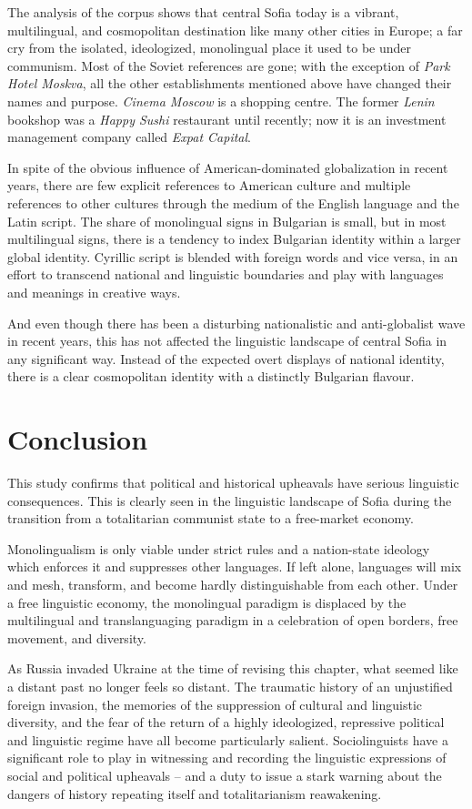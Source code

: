 \documentclass[output=paper]{langscibook}
\begin{document}
The analysis of the corpus shows that central Sofia today is a vibrant, multilingual, and cosmopolitan destination like many other cities in Europe; a far cry from the isolated, ideologized, monolingual place it used to be under communism. Most of the Soviet references are gone; with the exception of \textit{Park Hotel Moskva}, all the other establishments mentioned above have changed their names and purpose. \textit{Cinema Moscow} is a shopping centre. The former \textit{Lenin} bookshop was a \textit{Happy Sushi} restaurant until recently; now it is an investment management company called \textit{Expat Capital}. 

In spite of the obvious influence of American-dominated globalization in recent years, there are few explicit references to American culture and multiple references to other cultures through the medium of the English language and the Latin script. The share of monolingual signs in Bulgarian is small, but in most multilingual signs, there is a tendency to index Bulgarian identity within a larger global identity. Cyrillic script is blended with foreign words and vice versa, in an effort to transcend national and linguistic boundaries and play with languages and meanings in creative ways. 

And even though there has been a disturbing nationalistic and anti-globalist wave in recent years, this has not affected the linguistic landscape of central Sofia in any significant way. Instead of the expected overt displays of national identity, there is a clear cosmopolitan identity with a distinctly Bulgarian flavour.

\section{Conclusion}
This study confirms that political and historical upheavals have serious linguistic consequences. This is clearly seen in the linguistic landscape of Sofia during the transition from a totalitarian communist state to a free-market economy. 

Monolingualism is only viable under strict rules and a nation-state ideology which enforces it and suppresses other languages. If left alone, languages will mix and mesh, transform, and become hardly distinguishable from each other. Under a free linguistic economy, the monolingual paradigm is displaced by the multilingual and translanguaging paradigm in a celebration of open borders, free movement, and diversity. 

As Russia invaded Ukraine at the time of revising this chapter, what seemed like a distant past no longer feels so distant. The traumatic history of an unjustified foreign invasion, the memories of the suppression of cultural and linguistic diversity, and the fear of the return of a highly ideologized, repressive political and linguistic regime have all become particularly salient. Sociolinguists have a significant role to play in witnessing and recording the linguistic expressions of social and political upheavals – and a duty to issue a stark warning about the dangers of history repeating itself and totalitarianism reawakening. 



\printbibliography[heading=subbibliography, notkeyword=this]
\end{document}
